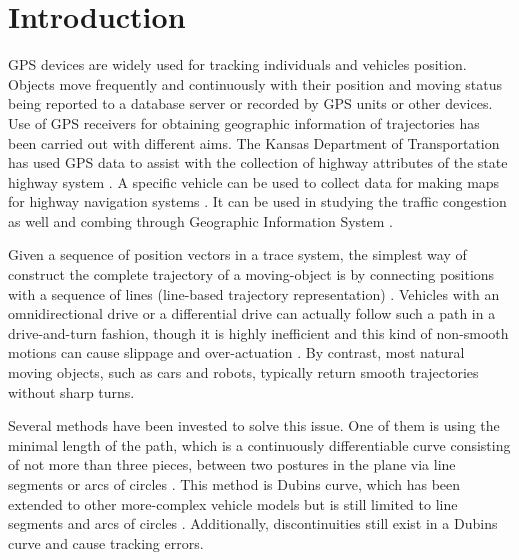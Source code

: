 
\section{Introduction}

GPS devices are widely used for tracking individuals and vehicles position. Objects move frequently and continuously with their position and moving status being reported to a database server or recorded by GPS units or other devices. Use of GPS receivers for obtaining geographic information of trajectories has been carried out with different aims. The Kansas Department of Transportation has used GPS data to assist with the collection of highway attributes of the state highway system \cite{ben2004geometric}.  A specific vehicle can be used to collect data for making maps for highway navigation systems \cite{Atkinson2004}. It can be used in studying the traffic congestion as well and combing through Geographic Information System \cite{taylor2000integration}. 

Given a sequence of position vectors in a trace system, the simplest way of construct the complete trajectory of a moving-object is by connecting positions with a sequence of lines (line-based trajectory representation) \cite{agarwal2003indexing}. Vehicles with an omnidirectional drive or a differential drive can actually follow such a path in a drive-and-turn fashion, though it is highly inefficient \cite{gloderer2010spline} and this kind of non-smooth motions can cause slippage and over-actuation \cite{magid2006spline}. By contrast, most natural moving objects, such as cars and robots, typically return smooth trajectories without sharp turns. 

Several methods have been invested to solve this issue. One of them is using the minimal length of the path, which is a continuously differentiable curve consisting of not more than three pieces,  between two postures in the plane via line segments or arcs of circles \cite{dubins1957curves}. This method is Dubins curve, which has been extended to other more-complex vehicle models but is still limited to line segments and arcs of circles \cite{yang2010analytical}. Additionally, discontinuities still exist in a Dubins curve and cause tracking errors. 

